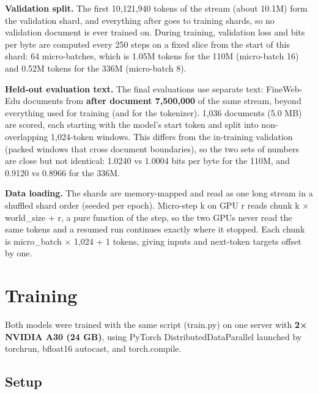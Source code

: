 \documentclass[11pt]{article}
\begin{document}
\textbf{Validation split.} The first 10,121,940 tokens of the stream (about 10.1M) form the validation shard, and everything after goes to training shards, so no validation document is ever trained on. During training, validation loss and bits per byte are computed every 250 steps on a fixed slice from the start of this shard: 64 micro-batches, which is 1.05M tokens for the 110M (micro-batch 16) and 0.52M tokens for the 336M (micro-batch 8).

\textbf{Held-out evaluation text.} The final evaluations use separate text: FineWeb-Edu documents from \textbf{after document 7,500,000} of the same stream, beyond everything used for training (and for the tokenizer). 1,036 documents (5.0 MB) are scored, each starting with the model's start token and split into non-overlapping 1,024-token windows. This differs from the in-training validation (packed windows that cross document boundaries), so the two sets of numbers are close but not identical: 1.0240 vs 1.0004 bits per byte for the 110M, and 0.9120 vs 0.8966 for the 336M.

\textbf{Data loading.} The shards are memory-mapped and read as one long stream in a shuffled shard order (seeded per epoch). Micro-step k on GPU r reads chunk k × world\_\allowbreak{}size + r, a pure function of the step, so the two GPUs never read the same tokens and a resumed run continues exactly where it stopped. Each chunk is micro\_\allowbreak{}batch × 1,024 + 1 tokens, giving inputs and next-token targets offset by one.

\section{Training}

Both models were trained with the same script (train.py) on one server with \textbf{2× NVIDIA A30 (24 GB)}, using PyTorch DistributedDataParallel launched by torchrun, bfloat16 autocast, and torch.compile.

\subsection{Setup}
\end{document}
